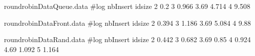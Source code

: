 
\begin{filecontents}{roundrobinDataQueue.data}
#log nbInsert idsize  
2 0.2
3 0.966
3.69 4.714
4 9.508
\end{filecontents}

\begin{filecontents}{roundrobinDataFront.data}
#log nbInsert  idsize  
2 0.394
3 1.186
3.69 5.084
4 9.88
\end{filecontents}

\begin{filecontents}{roundrobinDataRand.data}
#log nbInsert  idsize  
2 0.442
3 0.682
3.69 0.85
4 0.924
4.69 1.092
5 1.164
\end{filecontents}
